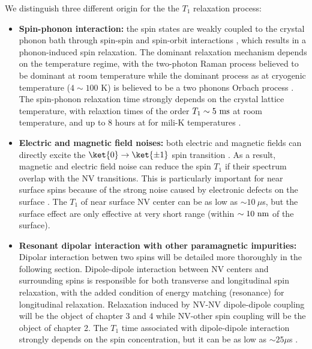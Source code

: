 \documentclass[a4paper,11pt]{report}
\begin{document}
We distinguish three different origin for the the $T_1$ relaxation process:
\begin{itemize}
\item \textbf{Spin-phonon interaction:} the spin states are weakly coupled to the crystal phonon bath through spin-spin and spin-orbit interactions \citep{norambuena2018spin}, which results in a phonon-induced spin relaxation. The dominant relaxation mechanism depends on the  temperature regime, with the two-photon Raman process believed to be dominant at room temperature \citep{takahashi2008quenching, jarmola2012temperature} while the dominant process as at cryogenic temperature ($4\sim100$ K) is believed to be a two phonons Orbach process \citep{redman1991spin, norambuena2018spin}. The spin-phonon relaxation time strongly depends on the crystal lattice temperature, with relaxtion times of the order $T_1 \sim 5\ \rm ms$ at room temperature, and up to 8 hours at for mili-K temperatures \citep{astner2018solid}.

\item \textbf{Electric and magnetic field noises:} both electric and magnetic fields can directly excite the $\ket{0} \to \ket{\pm 1}$ spin transition \citep{udvarhelyi2018spin}. As a result, magnetic and electric field noise can reduce the spin $T_1$ if their spectrum overlap with the NV transitions. This is particularly important for near surface spins because of the strong noise caused by electronic defects on the surface \citep{sangtawesin2019origins}. The $T_1$ of near surface NV center can be as low as $\sim 10\ \mu$s, but the surface effect are only effective at very short range (within $\sim 10\ \rm nm$ of the surface).

\item \textbf{Resonant dipolar interaction with other paramagnetic impurities:} Dipolar interaction betwen two spins will be detailed more thoroughly in the following section. Dipole-dipole interaction between NV centers and surrounding spins is responsible for both transverse and longitudinal spin relaxation, with the added condition of energy matching (resonance) for longitudinal relaxation. Relaxation induced by NV-NV dipole-dipole coupling will be the object of chapter 3 and 4 while NV-other spin coupling will be the object of chapter 2. The $T_1$ time associated with dipole-dipole interaction strongly depends on the spin concentration, but it can be as low as $\sim 25 \mu$s \citep{hall2016detection}.
\end{itemize}
\end{document}
